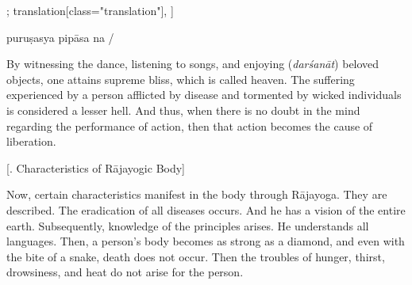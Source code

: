 \begin{alignment}[
  texts=edition[class="edition"];
  translation[class="translation"],
  ]
\begin{edition}
\begin{prose}
puruṣasya
pipāsa
na
/\vspace*{\fill}
    \end{prose}
  \end{edition}
  \begin{translation}
    \begin{tlate}
      \noindent
      By witnessing the dance, listening to songs, and enjoying (\textit{darśanāt}) beloved objects, one attains supreme bliss, which is called heaven. The suffering experienced by a person afflicted by disease and tormented by wicked individuals is considered a lesser hell.
And thus, when there is no doubt in the mind regarding the performance of action, then that action becomes the cause of liberation.
    \end{tlate}
    \begin{tlate}
     \bigskip
    \centerline{\textrm{\small{[. Characteristics of Rājayogic Body]}}}
    \label{attributesrajabody}
    \bigskip
Now, certain characteristics manifest in the body through Rājayoga. They are described. The eradication of all diseases occurs. And he has a vision of the entire earth. Subsequently, knowledge of the principles arises. 
He understands all languages. Then, a person's body becomes as strong as a diamond, and even with the bite of a snake, death does not occur. Then the troubles of hunger, thirst, drowsiness, and heat do not arise for the person.
    \end{tlate}
  \end{translation}
\end{alignment}
\pagebreak %
